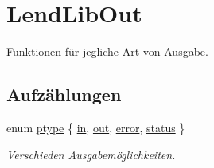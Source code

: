 \hypertarget{group___lend_lib_out}{}\section{Lend\+Lib\+Out}
\label{group___lend_lib_out}


Funktionen für jegliche Art von Ausgabe.  


\subsection*{Aufzählungen}
\begin{DoxyCompactItemize}
\item 
enum \hyperlink{group___lend_lib_out_ga0916607956575302a93dbd21440edc1a}{ptype} \{ \hyperlink{group___lend_lib_out_gga0916607956575302a93dbd21440edc1aa9e70047869d00c5afd8c68af325e48d7}{in}, 
\hyperlink{group___lend_lib_out_gga0916607956575302a93dbd21440edc1aaaca14bf8f96bb2b357f12496b7f11579}{out}, 
\hyperlink{group___lend_lib_out_gga0916607956575302a93dbd21440edc1aad606e435413ea0944dd00d49e901e4ed}{error}, 
\hyperlink{group___lend_lib_out_gga0916607956575302a93dbd21440edc1aa9a6940c3bba41cdd6dacae1a00176a30}{status}
 \}\begin{DoxyCompactList}\small\item\em Verschieden Ausgabemöglichkeiten. \end{DoxyCompactList}
\end{DoxyCompactItemize}
